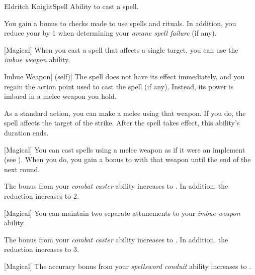     \begin{feat}{Eldritch Knight}{Spell}
        \featpre Ability to cast a spell.

         You gain a  bonus to  checks made to use spells and rituals.
        In addition, you reduce your  by 1 when determining your \textit{arcane spell failure} (if any).

        [Magical] When you cast a spell that affects a single target, you can use the \textit{imbue weapon} ability.
        \begin{attuneability}{Imbue Weapon}[ (self)]
            The spell does not have its effect immediately, and you regain the action point used to cast the spell (if any).
            Instead, its power is imbued in a melee weapon you hold.

            As a standard action, you can make a melee  using that weapon.
            If you do, the spell affects the target of the strike.
            After the spell takes effect, this ability's duration ends.
        \end{attuneability}

        [Magical] You can cast spells using a melee weapon as if it were an implement (see ).
        When you do, you gain a  bonus to  with that weapon until the end of the next round.

         The  bonus from your \textit{combat caster} ability increases to .
        In addition, the  reduction increases to 2.

        [Magical] You can maintain two separate attunements to your \textit{imbue weapon} ability.

         The  bonus from your \textit{combat caster} ability increases to .
        In addition, the  reduction increases to 3.

        [Magical] The accuracy bonus from your \textit{spellsword conduit} ability increases to .
    \end{feat}

